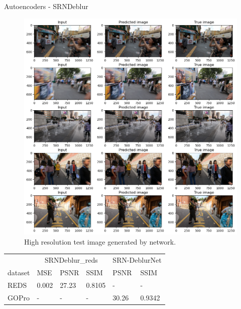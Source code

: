 \documentclass{beamer}
\begin{document}
\begin{frame}{Autoencoders - SRNDeblur\cite{SRN-DeblurNet}}
{\begin{figure}
            \includegraphics[height=0.57\textheight,keepaspectratio]{srndeblur/test.png}
            \caption{High resolution test image generated by \textcolor{orange}{\srnreds} network. \\ }
        \end{figure}                        
        \begin{center}
            \tiny
            \begin{tabularx}{0.5\columnwidth}{XXXXXX}
                & \multicolumn{3}{c}{SRNDeblur\_reds} & \multicolumn{2}{c}{SRN-DeblurNet} \\
                dataset & MSE & PSNR & SSIM & PSNR & SSIM \\
                \hline
                REDS & 0.002 & 27.23 & 0.8105 & - & - \\
                GOPro & - & - & - & 30.26 & 0.9342 \\
                \hline            
                \end{tabularx}
        \end{center}
    }
\end{frame}
\end{document}
